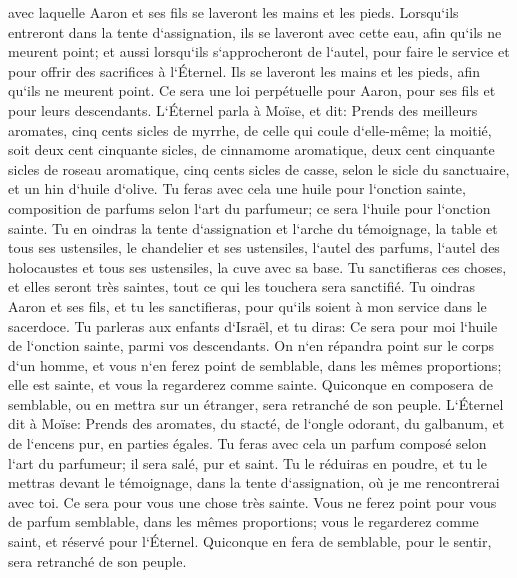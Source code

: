 \verse avec laquelle Aaron et ses fils se laveront les mains et les pieds. 
\verse Lorsqu`ils entreront dans la tente d`assignation, ils se laveront avec cette eau, afin qu`ils ne meurent point; et aussi lorsqu`ils s`approcheront de l`autel, pour faire le service et pour offrir des sacrifices à l`Éternel. 
\verse Ils se laveront les mains et les pieds, afin qu`ils ne meurent point. Ce sera une loi perpétuelle pour Aaron, pour ses fils et pour leurs descendants. 
\verse L`Éternel parla à Moïse, et dit: 
\verse Prends des meilleurs aromates, cinq cents sicles de myrrhe, de celle qui coule d`elle-même; la moitié, soit deux cent cinquante sicles, de cinnamome aromatique, deux cent cinquante sicles de roseau aromatique, 
\verse cinq cents sicles de casse, selon le sicle du sanctuaire, et un hin d`huile d`olive. 
\verse Tu feras avec cela une huile pour l`onction sainte, composition de parfums selon l`art du parfumeur; ce sera l`huile pour l`onction sainte. 
\verse Tu en oindras la tente d`assignation et l`arche du témoignage, 
\verse la table et tous ses ustensiles, le chandelier et ses ustensiles, l`autel des parfums, 
\verse l`autel des holocaustes et tous ses ustensiles, la cuve avec sa base. 
\verse Tu sanctifieras ces choses, et elles seront très saintes, tout ce qui les touchera sera sanctifié. 
\verse Tu oindras Aaron et ses fils, et tu les sanctifieras, pour qu`ils soient à mon service dans le sacerdoce. 
\verse Tu parleras aux enfants d`Israël, et tu diras: Ce sera pour moi l`huile de l`onction sainte, parmi vos descendants. 
\verse On n`en répandra point sur le corps d`un homme, et vous n`en ferez point de semblable, dans les mêmes proportions; elle est sainte, et vous la regarderez comme sainte. 
\verse Quiconque en composera de semblable, ou en mettra sur un étranger, sera retranché de son peuple. 
\verse L`Éternel dit à Moïse: Prends des aromates, du stacté, de l`ongle odorant, du galbanum, et de l`encens pur, en parties égales. 
\verse Tu feras avec cela un parfum composé selon l`art du parfumeur; il sera salé, pur et saint. 
\verse Tu le réduiras en poudre, et tu le mettras devant le témoignage, dans la tente d`assignation, où je me rencontrerai avec toi. Ce sera pour vous une chose très sainte. 
\verse Vous ne ferez point pour vous de parfum semblable, dans les mêmes proportions; vous le regarderez comme saint, et réservé pour l`Éternel. 
\verse Quiconque en fera de semblable, pour le sentir, sera retranché de son peuple. 

